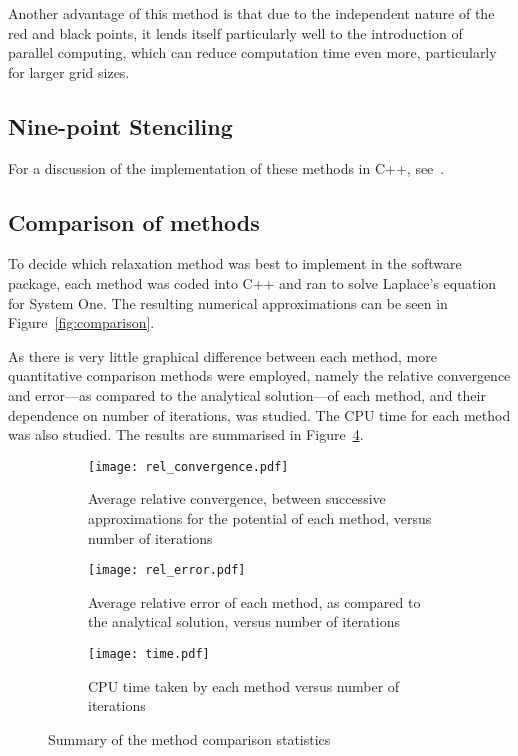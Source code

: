 \documentclass[11pt, a4paper]{article}
\begin{document}
Another advantage of this method is that due to the independent nature of the red and
black points, it lends itself particularly well to the introduction of parallel 
computing, which can reduce computation time even more, particularly for larger grid
sizes.

\subsection{Nine-point Stenciling}


For a discussion of the implementation of these methods in C++, see~\cite{nr}.

\subsection{Comparison of methods}

To decide which relaxation method was best to implement in the software package,
each method was coded into C++ and ran to solve Laplace's equation for System One.
The resulting numerical approximations can be seen in Figure~\ref{fig:comparison}.


As there is very little graphical difference between each method, more quantitative
comparison methods were employed, namely the relative convergence and error---as
compared to the analytical solution---of each method, and their dependence on number
of iterations, was studied. The CPU time for each method was also studied. The results
are summarised in Figure~\ref{fig:stats}.


\begin{figure}
\centering
\begin{subfigure}{0.8\textwidth}
	\texttt{[image: rel\_convergence.pdf]}
	\caption{Average relative convergence, between successive approximations for the potential of each method, versus number of iterations}
	\label{fig:conv}
\end{subfigure}

\begin{subfigure}{0.8\textwidth}
	\texttt{[image: rel\_error.pdf]}
	\caption{Average relative error of each method, as compared to the analytical solution, versus number of iterations}
	\label{fig:err}
\end{subfigure}

\begin{subfigure}{0.8\textwidth}
	\texttt{[image: time.pdf]}
	\caption{CPU time taken by each method versus number of iterations}
	\label{fig:time}
\end{subfigure}
\caption{Summary of the method comparison statistics}
\label{fig:stats}
\end{figure}
\end{document}
